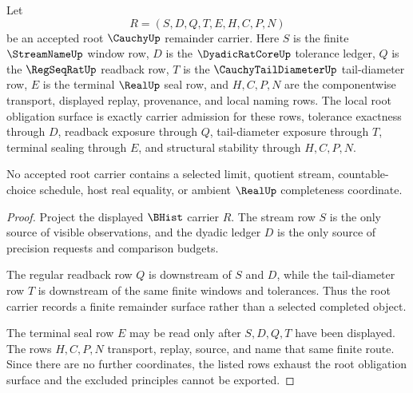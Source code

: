 \begin{theorem}
\label{thm:cauchy-carrier-root-obligations}
Let
$$
R=(S,D,Q,T,E,H,C,P,N)
$$
be an accepted root $\CauchyUp$ remainder carrier. Here $S$ is the finite $\StreamNameUp$ window row, $D$ is the $\DyadicRatCoreUp$ tolerance ledger, $Q$ is the $\RegSeqRatUp$ readback row, $T$ is the $\CauchyTailDiameterUp$ tail-diameter row, $E$ is the terminal $\RealUp$ seal row, and $H,C,P,N$ are the componentwise transport, displayed replay, provenance, and local naming rows. The local root obligation surface is exactly carrier admission for these rows, tolerance exactness through $D$, readback exposure through $Q$, tail-diameter exposure through $T$, terminal sealing through $E$, and structural stability through $H,C,P,N$.

No accepted root carrier contains a selected limit, quotient stream, countable-choice schedule, host real equality, or ambient $\RealUp$ completeness coordinate.
\end{theorem}
\begin{proof}
Project the displayed $\BHist$ carrier $R$. The stream row $S$ is the only source of visible observations, and the dyadic ledger $D$ is the only source of precision requests and comparison budgets.

The regular readback row $Q$ is downstream of $S$ and $D$, while the tail-diameter row $T$ is downstream of the same finite windows and tolerances. Thus the root carrier records a finite remainder surface rather than a selected completed object.

The terminal seal row $E$ may be read only after $S,D,Q,T$ have been displayed. The rows $H,C,P,N$ transport, replay, source, and name that same finite route. Since there are no further coordinates, the listed rows exhaust the root obligation surface and the excluded principles cannot be exported.
\end{proof}

